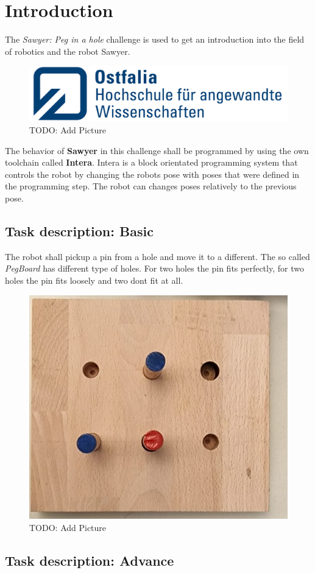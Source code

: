 \chapter{Introduction}

The \textit{Sawyer: Peg in a hole} challenge is used to get an introduction
into the field of robotics and the robot Sawyer.

\begin{figure}[H]
	\begin{center}
		\includegraphics[width=0.3\linewidth]{images/ostfalia_logo_left.png}
		\caption{TODO: Add Picture}
	\end{center}
\end{figure}

The behavior of \textbf{Sawyer} in this challenge shall be programmed by using the own toolchain called \textbf{Intera}.
Intera is a block orientated programming system that controls the robot by changing the robots pose
with poses that were defined in the programming step.
The robot can changes poses relatively to the previous pose.

\section{Task description: Basic}

The robot shall pickup a pin from a hole and move it to a different.
The so called \textit{PegBoard} has different type of holes.
For two holes the pin fits perfectly,
for two holes the pin fits loosely and
two dont fit at all.

\begin{figure}[H]
	\begin{center}
		\includegraphics[width=0.3\linewidth]{images/PegBoard.png}
		\caption{TODO: Add Picture}
	\end{center}
\end{figure}

\section{Task description: Advance}

